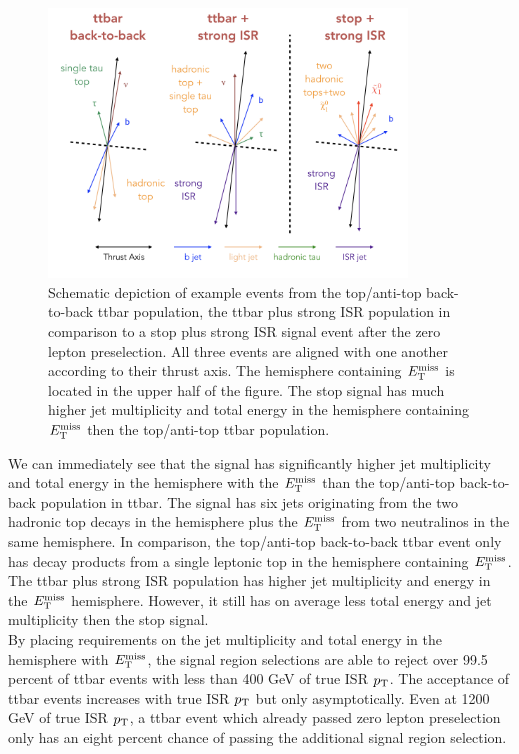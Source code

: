 \begin{figure}[h!]
  \centering
	\includegraphics[width=0.85\textwidth]{./figures/strategy/ttbar_vs_signal.png}
\caption[Schematic depiction of example events from the top/anti-top back-to-back ttbar population, the ttbar plus strong ISR population in comparison to a stop plus strong ISR signal event after the zero lepton preselection]{Schematic depiction of example events from the top/anti-top back-to-back ttbar population, the ttbar plus strong ISR population in comparison to a stop plus strong ISR signal event after the zero lepton preselection.  All three events are aligned with one another according to their thrust axis.  The hemisphere containing $E_{\mathrm{T}}^{\mathrm{miss}}$ is located in the upper half of the figure.  The stop signal has much higher jet multiplicity and total energy in the hemisphere containing $E_{\mathrm{T}}^{\mathrm{miss}}$ then the top/anti-top ttbar population. }
\label{fig:ttbar:3pop}
\end{figure}

\indent We can immediately see that the signal has significantly higher jet multiplicity and total energy in the hemisphere with the $E_{\mathrm{T}}^{\mathrm{miss}}$ than the top/anti-top back-to-back population in ttbar.  The signal has six jets originating from the two hadronic top decays in the hemisphere plus the $E_{\mathrm{T}}^{\mathrm{miss}}$ from two neutralinos in the same hemisphere.  In comparison, the top/anti-top back-to-back ttbar event only has decay products from a single leptonic top in the hemisphere containing $E_{\mathrm{T}}^{\mathrm{miss}}$.   The ttbar plus strong ISR population has higher jet multiplicity and energy in the $E_{\mathrm{T}}^{\mathrm{miss}}$ hemisphere. However, it still has on average less total energy and jet multiplicity then the stop signal.  \\

\indent By placing requirements on the jet multiplicity and total energy in the hemisphere with $E_{\mathrm{T}}^{\mathrm{miss}}$, the signal region selections are able to reject over 99.5 percent of ttbar events with less than 400 GeV of true ISR $p_{\mathrm{T}}$.  The acceptance of ttbar events increases with true ISR $p_{\mathrm{T}}$ but only asymptotically.  Even at 1200 GeV of true ISR $p_{\mathrm{T}}$, a ttbar event which already passed zero lepton preselection only has an eight percent chance of passing the additional signal region selection.  \\

